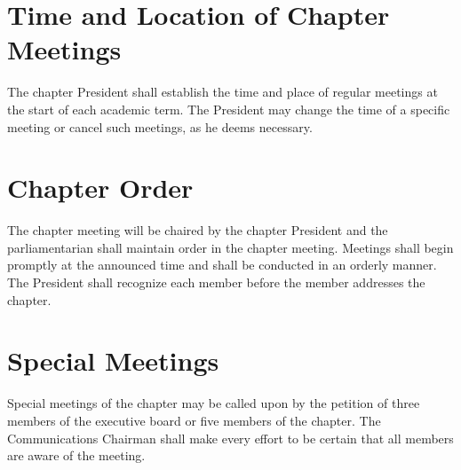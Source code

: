 \section{Time and Location of Chapter Meetings}
The chapter President shall establish the time and place of regular meetings at the start of each academic term. The President may change the time of a specific meeting or cancel such meetings, as he deems necessary.
\section{Chapter Order}
The chapter meeting will be chaired by the chapter President and the parliamentarian shall maintain order in the chapter meeting. Meetings shall begin promptly at the announced time and shall be conducted in an orderly manner. The President shall recognize each member before the member addresses the chapter.
\section{Special Meetings}
Special meetings of the chapter may be called upon by the petition of three members of the executive board or five members of the chapter. The Communications Chairman shall make every effort to be certain that all members are aware of the meeting.

